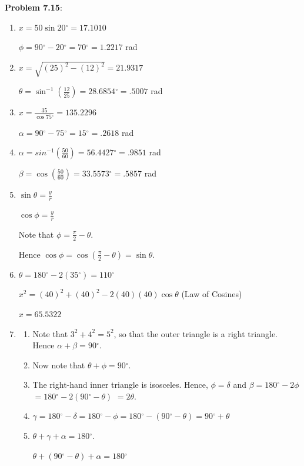 \documentclass[english]{book}
\newcommand{\degrees}{\ensuremath{^{\circ}}}
\begin{document}
\textbf{Problem 7.15}:
\begin{enumerate}[\hspace{1cm}1)]
  \item $x = 50 \sin 20 \degrees = 17.1010$

      $\phi = 90 \degrees - 20 \degrees = 70 \degrees = 1.2217$ rad
  \item $x = \sqrt{ (25)^{2} - (12)^{2} } = 21.9317$

      $\theta = \sin^{-1} (\frac{12}{25}) = 28.6854 \degrees = .5007$ rad
  \item $x = \frac{35}{\cos 75 \degrees} = 135.2296$

      $\alpha = 90 \degrees - 75 \degrees = 15 \degrees = .2618$ rad
  \item $\alpha = sin^{-1} (\frac{50}{60}) = 56.4427 \degrees = .9851$ rad

      $\beta = \cos (\frac{50}{60}) = 33.5573 \degrees = .5857$ rad
  \item $\sin \theta = \frac{y}{r}$

      $\cos \phi = \frac{y}{r}$

      Note that $\phi = \frac{\pi}{2} - \theta$.

      Hence $\cos \phi = \cos (\frac{\pi}{2} - \theta) = \sin \theta$.
  \item $\theta = 180 \degrees - 2 (35 \degrees) = 110 \degrees$

      $x^{2} = (40)^{2} + (40)^{2} - 2 (40) (40) \cos \theta$ (Law of Cosines)

      $x = 65.5322$
  \item \begin{enumerate}[\hspace{1cm}a)]
          \item Note that $3^{2} + 4^{2} = 5^{2}$, so that the outer triangle is a right triangle. Hence $\alpha + \beta = 90 \degrees$.
          \item Now note that $\theta + \phi = 90 \degrees$.
          \item The right-hand inner triangle is isosceles. Hence, $\phi = \delta$ and $\beta = 180 \degrees - 2 \phi$ $= 180 \degrees - 2 (90 \degrees - \theta)$ $= 2 \theta$.
          \item $\gamma = 180 \degrees - \delta = 180 \degrees - \phi = 180 \degrees - (90 \degrees - \theta) = 90 \degrees + \theta$
          \item $\theta + \gamma + \alpha = 180 \degrees$.

              $\theta + (90 \degrees - \theta) + \alpha = 180 \degrees$


\end{enumerate}
\end{enumerate}
\end{document}
